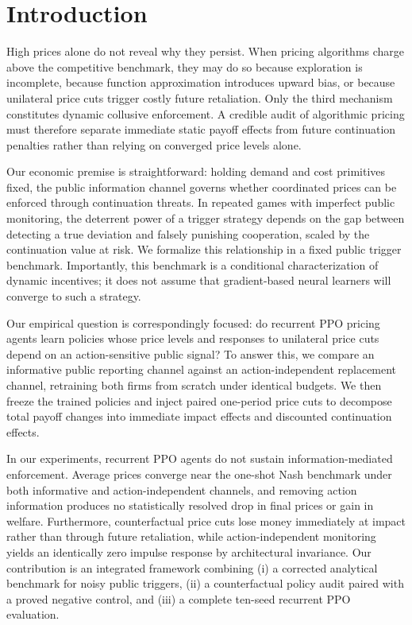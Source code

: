 \section{Introduction}

High prices alone do not reveal why they persist. When pricing algorithms charge above the competitive benchmark, they may do so because exploration is incomplete, because function approximation introduces upward bias, or because unilateral price cuts trigger costly future retaliation. Only the third mechanism constitutes dynamic collusive enforcement. A credible audit of algorithmic pricing must therefore separate immediate static payoff effects from future continuation penalties rather than relying on converged price levels alone.

Our economic premise is straightforward: holding demand and cost primitives fixed, the public information channel governs whether coordinated prices can be enforced through continuation threats. In repeated games with imperfect public monitoring, the deterrent power of a trigger strategy depends on the gap between detecting a true deviation and falsely punishing cooperation, scaled by the continuation value at risk. We formalize this relationship in a fixed public trigger benchmark. Importantly, this benchmark is a conditional characterization of dynamic incentives; it does not assume that gradient-based neural learners will converge to such a strategy.

Our empirical question is correspondingly focused: do recurrent PPO pricing agents learn policies whose price levels and responses to unilateral price cuts depend on an action-sensitive public signal? To answer this, we compare an informative public reporting channel against an action-independent replacement channel, retraining both firms from scratch under identical budgets. We then freeze the trained policies and inject paired one-period price cuts to decompose total payoff changes into immediate impact effects and discounted continuation effects.

In our experiments, recurrent PPO agents do not sustain information-mediated enforcement. Average prices converge near the one-shot Nash benchmark under both informative and action-independent channels, and removing action information produces no statistically resolved drop in final prices or gain in welfare. Furthermore, counterfactual price cuts lose money immediately at impact rather than through future retaliation, while action-independent monitoring yields an identically zero impulse response by architectural invariance. Our contribution is an integrated framework combining (i) a corrected analytical benchmark for noisy public triggers, (ii) a counterfactual policy audit paired with a proved negative control, and (iii) a complete ten-seed recurrent PPO evaluation.

